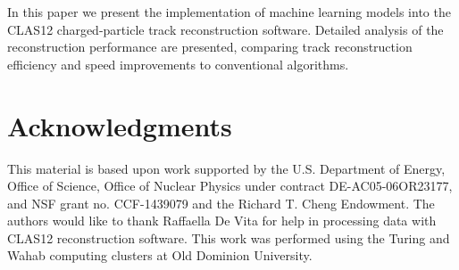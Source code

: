 \documentclass[aps,prl,preprint,12pt]{revtex4}
\begin{document}
In this paper we present the implementation of machine learning models into the CLAS12 charged-particle track 
reconstruction software. Detailed analysis of the reconstruction performance are presented, comparing track 
reconstruction efficiency and speed improvements to conventional algorithms.






\section{Acknowledgments}

This material is based upon work supported by the U.S. Department of Energy, Office of Science, Office of Nuclear 
Physics under contract DE-AC05-06OR23177, and NSF grant no. CCF-1439079 and the Richard T. Cheng Endowment. 
The authors would like to thank Raffaella De Vita for help in processing data with CLAS12 reconstruction software. 
This  work  was  performed  using  the  Turing  and  Wahab computing clusters at Old Dominion University.
 
\newpage


\end{document}
